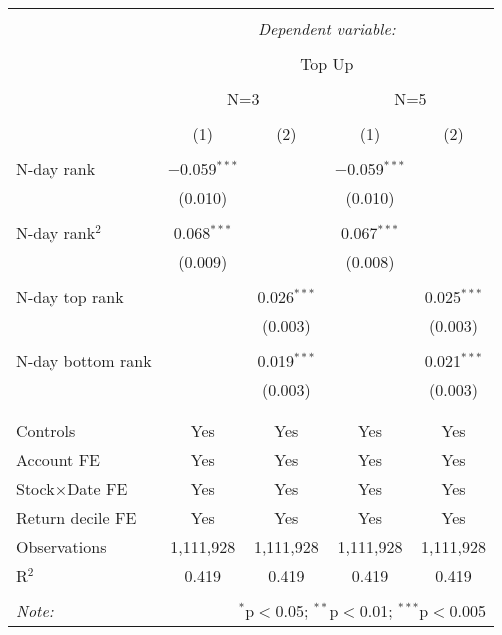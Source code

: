 
\begin{table}[!htbp] \centering 
	\caption{} 
	\label{} 
	\begin{tabular}{@{\extracolsep{5pt}}lcccc} 
		\\[-1.8ex]\hline 
		\hline \\[-1.8ex] 
		& \multicolumn{4}{c}{\textit{Dependent variable:}} \\ 
		\cline{2-5} 
		\\[-1.8ex] & \multicolumn{4}{c}{Top Up} \\ 
		\\[-1.8ex] & \multicolumn{2}{c}{N=3}& \multicolumn{2}{c}{N=5} \\
		\cmidrule(lr){2-3}
		\cmidrule(lr){4-5}
		\\[-1.8ex] & (1) & (2) & (1) & (2)\\ 
		\hline \\[-1.8ex] 
		
		
 N-day rank & $-$0.059$^{***}$ &  & $-$0.059$^{***}$ &  \\ 
& (0.010) &  & (0.010) &  \\ 
& & & & \\ 
N-day rank$^2$ & 0.068$^{***}$ &  & 0.067$^{***}$ &  \\ 
& (0.009) &  & (0.008) &  \\ 
& & & & \\ 
N-day top rank &  & 0.026$^{***}$ &  & 0.025$^{***}$ \\ 
&  & (0.003) &  & (0.003) \\ 
& & & & \\ 
N-day bottom rank &  & 0.019$^{***}$ &  & 0.021$^{***}$ \\ 
&  & (0.003) &  & (0.003) \\ 
& & & & \\ 	
\hline \\[-1.8ex] 	
Controls & Yes & Yes & Yes & Yes \\ 
Account FE & Yes & Yes & Yes & Yes \\ 
Stock$\times$Date FE & Yes & Yes & Yes & Yes \\ 
Return decile FE & Yes & Yes & Yes & Yes \\ 
Observations & 1,111,928 & 1,111,928 & 1,111,928 & 1,111,928 \\ 
R$^{2}$ & 0.419 & 0.419 & 0.419 & 0.419 \\ 
\hline 
\hline \\[-1.8ex] 
\textit{Note:}  & \multicolumn{4}{r}{$^{*}$p$<$0.05; $^{**}$p$<$0.01; $^{***}$p$<$0.005} \\ 
\end{tabular} 
\end{table} 

